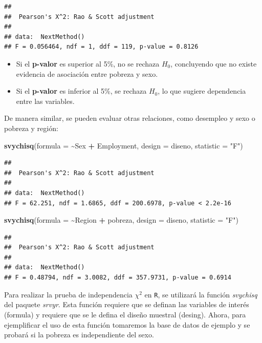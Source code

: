 \documentclass[
  12pt,
]{book}
\newenvironment{Shaded}{\begin{snugshade}}{\end{snugshade}}
\newcommand{\AttributeTok}[1]{\textcolor[rgb]{0.13,0.29,0.53}{#1}}
\newcommand{\FunctionTok}[1]{\textcolor[rgb]{0.13,0.29,0.53}{\textbf{#1}}}
\newcommand{\NormalTok}[1]{#1}
\newcommand{\SpecialCharTok}[1]{\textcolor[rgb]{0.81,0.36,0.00}{\textbf{#1}}}
\newcommand{\StringTok}[1]{\textcolor[rgb]{0.31,0.60,0.02}{#1}}
\providecommand{\tightlist}{%
  \setlength{\itemsep}{0pt}\setlength{\parskip}{0pt}}
\begin{document}
\begin{verbatim}
## 
##  Pearson's X^2: Rao & Scott adjustment
## 
## data:  NextMethod()
## F = 0.056464, ndf = 1, ddf = 119, p-value = 0.8126
\end{verbatim}

\begin{itemize}
\tightlist
\item
  Si el \textbf{p-valor} es superior al 5\%, no se rechaza \(H_0\), concluyendo que no existe evidencia de asociación entre pobreza y sexo.
\item
  Si el \textbf{p-valor} es inferior al 5\%, se rechaza \(H_0\), lo que sugiere dependencia entre las variables.
\end{itemize}

De manera similar, se pueden evaluar otras relaciones, como desempleo y sexo o pobreza y región:

\begin{Shaded}
\begin{Highlighting}[]
\FunctionTok{svychisq}\NormalTok{(}\AttributeTok{formula =} \SpecialCharTok{\textasciitilde{}}\NormalTok{Sex }\SpecialCharTok{+}\NormalTok{ Employment, }\AttributeTok{design =}\NormalTok{ diseno, }\AttributeTok{statistic =} \StringTok{"F"}\NormalTok{)}
\end{Highlighting}
\end{Shaded}

\begin{verbatim}
## 
##  Pearson's X^2: Rao & Scott adjustment
## 
## data:  NextMethod()
## F = 62.251, ndf = 1.6865, ddf = 200.6978, p-value < 2.2e-16
\end{verbatim}

\begin{Shaded}
\begin{Highlighting}[]
\FunctionTok{svychisq}\NormalTok{(}\AttributeTok{formula =} \SpecialCharTok{\textasciitilde{}}\NormalTok{Region }\SpecialCharTok{+}\NormalTok{ pobreza, }\AttributeTok{design =}\NormalTok{ diseno, }\AttributeTok{statistic =} \StringTok{"F"}\NormalTok{)}
\end{Highlighting}
\end{Shaded}

\begin{verbatim}
## 
##  Pearson's X^2: Rao & Scott adjustment
## 
## data:  NextMethod()
## F = 0.48794, ndf = 3.0082, ddf = 357.9731, p-value = 0.6914
\end{verbatim}

Para realizar la prueba de independencia \(\chi^{2}\) en \texttt{R}, se utilizará la función \emph{svychisq} del paquete \emph{srvyr}. Esta función requiere que se definan las variables de interés (formula) y requiere que se le defina el diseño muestral (desing). Ahora, para ejemplificar el uso de esta función tomaremos la base de datos de ejemplo y se probará si la pobreza es independiente del sexo.
\end{document}
